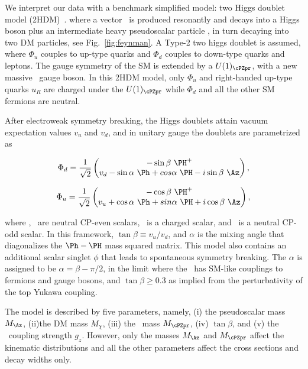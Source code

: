 We interpret our data with a benchmark simplified model: two Higgs doublet model 
(2HDM)~\cite{2HDM}. 
where a vector \cPZpr\ is produced resonantly and 
decays into a Higgs boson plus an intermediate heavy pseudoscalar particle \Az, in turn decaying into two DM particles, see Fig.~\ref{fig:feynman}. 
%
%
A Type-2 two higgs doublet is assumed, where 
$\Phi_u$ couples to up-type quarks and $\Phi_d$ couples to down-type
quarks and leptons. The gauge symmetry of the SM is extended by a
$U(1)_{\cPZpr}$, with a new massive \cPZpr\ gauge boson. In this 2HDM
model, only $\Phi_u$  and right-handed up-type quarks $u_R$ are charged 
under the $U(1)_{\cPZpr}$ while $\Phi_d$ and  all the other SM
fermions are neutral. 

After electroweak symmetry breaking, the Higgs doublets attain vacuum 
expectation values $v_u$ and $v_d$, and in unitary gauge the doublets are
parametrized as

\[
\Phi_d = \frac{1}{\sqrt{2}}
\begin{pmatrix}
 -\sin\beta~\PH^+\\
v_d - \sin\alpha~\Ph + cos\alpha~\PH - i \sin\beta~\Az
\end{pmatrix},
\]


\[
\Phi_u = \frac{1}{\sqrt{2}}
\begin{pmatrix}
 -\cos\beta~\PH^+\\
v_u + \cos\alpha~\Ph + sin\alpha~\PH + i \cos\beta~\Az
\end{pmatrix},
\]

where \Ph, \PH\ are neutral CP-even scalars, \Hpm\ is a charged scalar,
and \Az\ is a neutral CP-odd scalar. In this framework,
$\tan\beta\equiv v_u/v_d$, and $\alpha$ is the mixing angle that diagonalizes
the $\Ph-\PH$ mass squared matrix. This model also contains an
additional scalar singlet $\phi$ that leads to spontaneous symmetry
breaking. The $\alpha$ is assigned to be $\alpha = \beta - \pi/2$, 
in the limit where the \Ph\ has SM-like couplings to fermions and gauge
bosons, and $\tan \beta \geq 0.3$ as implied from the perturbativity
of the top Yukawa coupling. 

The model is described by five parameters, namely, (i) the pseudoscalar mass $M_{\Az}$, (ii)the DM mass $M_{\chi}$, (iii) the \cPZpr\ mass $M_{\cPZpr}$,
(iv) $\tan \beta$, and (v) the  \cPZpr\ coupling strength $g_z$.
However, only the masses $M_{\Az}$ and $M_{\cPZpr}$ affect the 
kinematic distributions and all the other parameters affect the cross sections and decay widths only. 

